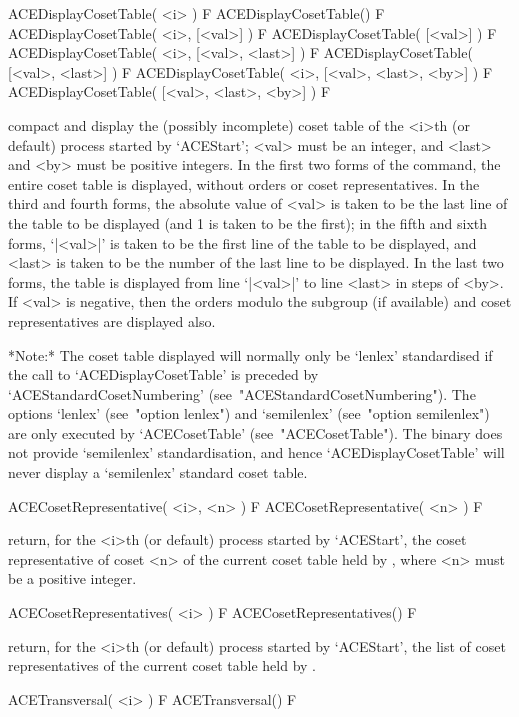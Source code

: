 \>ACEDisplayCosetTable( <i> ) F
\>ACEDisplayCosetTable() F
\>ACEDisplayCosetTable( <i>, [<val>] ) F
\>ACEDisplayCosetTable( [<val>] ) F
\>ACEDisplayCosetTable( <i>, [<val>, <last>] ) F
\>ACEDisplayCosetTable( [<val>, <last>] ) F
\>ACEDisplayCosetTable( <i>, [<val>, <last>, <by>] ) F
\>ACEDisplayCosetTable( [<val>, <last>, <by>] ) F

compact and display the (possibly incomplete) coset table of the <i>th
(or default) process started by `ACEStart'; <val> must be an  integer,
and <last> and <by> must be positive integers. In the first two  forms
of the command, the entire coset table is displayed, without orders or
coset representatives. In the third and  fourth  forms,  the  absolute
value of <val> is taken to be  the  last  line  of  the  table  to  be
displayed (and 1 is taken to be the first); in  the  fifth  and  sixth
forms, `|<val>|' is taken to be the first line  of  the  table  to  be
displayed, and <last> is taken to be the number of the last line to be
displayed. In the last two forms, the table  is  displayed  from  line
`|<val>|' to line <last> in steps of <by>. If <val> is negative,  then
the  orders   modulo   the   subgroup   (if   available)   and   coset
representatives are displayed also.

*Note:*
The coset table displayed will normally only be `lenlex'  standardised
if   the   call   to    `ACEDisplayCosetTable'    is    preceded    by
`ACEStandardCosetNumbering'   (see~"ACEStandardCosetNumbering").   The
options `lenlex' (see~"option lenlex") and  `semilenlex'  (see~"option
semilenlex")     are     only     executed     by      `ACECosetTable'
(see~"ACECosetTable"). The {\ACE} binary does not provide `semilenlex'
standardisation, and hence `ACEDisplayCosetTable' will never display a
`semilenlex' standard coset table.

\>ACECosetRepresentative( <i>, <n> ) F
\>ACECosetRepresentative( <n> ) F

return, for the <i>th (or default) process started by `ACEStart',  the
coset representative of coset <n> of the current coset table  held  by
{\ACE}, where <n> must be a positive integer.

\>ACECosetRepresentatives( <i> ) F
\>ACECosetRepresentatives() F

return, for the <i>th (or default) process started by `ACEStart',  the
list of coset representatives of  the  current  coset  table  held  by
{\ACE}.

\>ACETransversal( <i> ) F
\>ACETransversal() F

